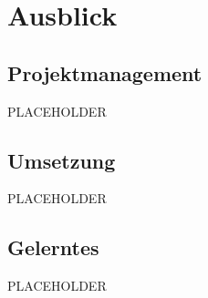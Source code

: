\section{Ausblick}
\label{sec:org86bdafa}
\subsection{Projektmanagement}
\label{sec:orgfeb0d16}

PLACEHOLDER

\subsection{Umsetzung}
\label{sec:org207420a}

PLACEHOLDER

\subsection{Gelerntes}
\label{sec:org4c37065}

PLACEHOLDER

